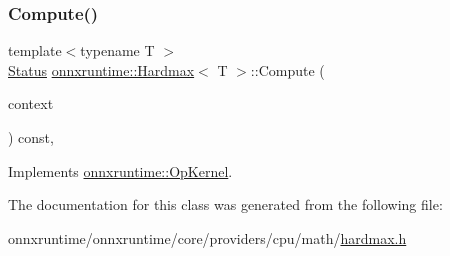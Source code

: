 \subsubsection{\texorpdfstring{Compute()}{Compute()}\hspace{0.1cm}{\footnotesize\ttfamily [2/2]}}
{\footnotesize\ttfamily template$<$typename T $>$ \\
\mbox{\hyperlink{classonnxruntime_1_1common_1_1Status}{Status}} \mbox{\hyperlink{classonnxruntime_1_1Hardmax}{onnxruntime\+::\+Hardmax}}$<$ T $>$\+::Compute (\begin{DoxyParamCaption}\item[{\mbox{\hyperlink{classonnxruntime_1_1OpKernelContext}{Op\+Kernel\+Context}} $\ast$}]{context }\end{DoxyParamCaption}) const\hspace{0.3cm}{\ttfamily [override]}, {\ttfamily [virtual]}}



Implements \mbox{\hyperlink{classonnxruntime_1_1OpKernel_a9eca8656a78b1b3ab9d3351a12798650}{onnxruntime\+::\+Op\+Kernel}}.



The documentation for this class was generated from the following file\+:\begin{DoxyCompactItemize}
\item 
onnxruntime/onnxruntime/core/providers/cpu/math/\mbox{\hyperlink{hardmax_8h}{hardmax.\+h}}\end{DoxyCompactItemize}
